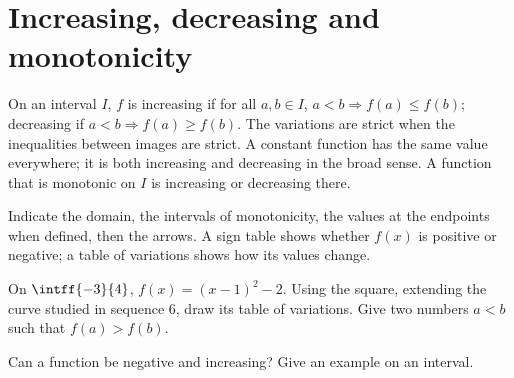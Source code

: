 \section{Increasing, decreasing and monotonicity}
\begin{keypoint}[Definitions]
On an interval $I$, $f$ is increasing if for all $a,b\in I$, $a<b\Rightarrow f(a)\leq f(b)$; decreasing if $a<b\Rightarrow f(a)\geq f(b)$. The variations are strict when the inequalities between images are strict. A constant function has the same value everywhere; it is both increasing and decreasing in the broad sense.
A function that is monotonic on $I$ is increasing or decreasing there.
\end{keypoint}
\begin{method}
Indicate the domain, the intervals of monotonicity, the values at the endpoints when defined, then the arrows. A sign table shows whether $f(x)$ is positive or negative; a table of variations shows how its values change.
\end{method}
\begin{example}On $\intff{-3}{4}$, $f(x)=(x-1)^2-2$. Using the square, extending the curve studied in sequence 6, draw its table of variations. Give two numbers $a<b$ such that $f(a)>f(b)$.\end{example}
\begin{example}Can a function be negative and increasing? Give an example on an interval.\end{example}

